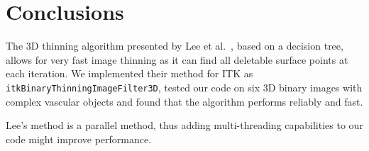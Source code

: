 \documentclass{InsightArticle}
\begin{document}
\section{Conclusions}
The 3D thinning algorithm presented by Lee et al.~, based on a decision tree, allows for very fast image thinning as it can find all deletable surface points at each iteration. We implemented their  method for ITK as \texttt{itkBinaryThinningImageFilter3D}, tested our code on six 3D binary images with complex vascular objects and found that the algorithm performs reliably and fast.

Lee's method is a parallel method, thus adding multi-threading capabilities to our code might improve performance.

%
%



\end{document}
